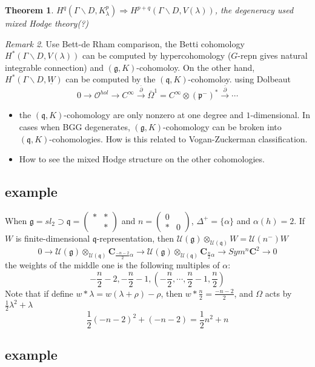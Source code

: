 \documentclass[leqno]{amsart}
\newcommand{\smat}[1]{\left( \begin{smallmatrix} #1 \end{smallmatrix} \right)}
\newcommand{\C}{\mathbf C}
\newcommand{\oo}{\mathcal O}
\newcommand{\1}{\mathbf{1}}
\newcommand{\cfg}{\mathfrak{g}}
\newcommand{\cfp}{\mathfrak{p}}
\newcommand{\cfq}{\mathfrak{q}}
\newtheorem{thm}{Theorem}[section]
\theoremstyle{definition}
\theoremstyle{remark}
\newtheorem{rem}[thm]{Remark}
\begin{document}
\begin{thm}
	$H^q(\Gamma\backslash D,K^p_\lambda)
	\Longrightarrow H^{p+q}
	(\Gamma\backslash D, V(\lambda))$,
	the degeneracy used mixed Hodge 
	theory(?)
\end{thm}
\begin{rem}
	Use Bett-de Rham comparison,
	the Betti cohomology
	$H^*(\Gamma\backslash D, V(\lambda))$
	can be computed by 
	hypercohomology
	($G$-repn gives natural 
	integrable connection)
	and
	$(\cfg,K)$-cohomoloy.
	On the other hand,
	$H^*(\Gamma\backslash D, \underline{W})$
	can be computed by the
	$(\cfq,K)$-cohomoloy.
	using Dolbeaut
	\[
		0\to \oo^{hol}\to C^\infty
		\xrightarrow{\bar{\partial}}
		\bar{\Omega}^1=
		C^\infty\otimes(\cfp^-)^*
		\xrightarrow{\bar{\partial}}\cdots
	\]
	\begin{itemize}
		\item the $(\cfq,K)$-cohomology
			are only nonzero at
			one degree and 
			 $1$-dimensional.
		In cases when BGG degenerates,
		$(\cfg,K)$-cohomology 
		can be broken into
		$(\cfq,K)$-cohomologies.
		How is this related to 
		Vogan-Zuckerman 
		classification.
	\item How to see the mixed Hodge structure
		on the other cohomologies.
	\end{itemize}
\end{rem}

\subsection{example}

When $\cfg=sl_2\supset \cfq=\smat{*&*\\&*}$ 
and $n=\smat{0&\\*&0}$,
$\Delta^+=\{\alpha\}$ and $\alpha(h)=2$.
If  $W$ is finite-dimensional  $\cfq$-representation,
then  $\mathcal{U}(\cfg)\otimes_{\mathcal{U}(\cfq)}W=\mathcal{U}(n^-)W$
\[
	0\to
	\mathcal{U}(\cfg)
	\otimes_{ \mathcal{U}(\cfq)}
	\C_{\frac{-n-2}{2}\alpha}\to
	\mathcal{U}(\cfg)
	\otimes_{ \mathcal{U}(\cfq)}
	\C_{\frac{n}{2}\alpha}\to
	Sym^n\C^2\to0
\]
the weights of the middle one is
the following multiples of $\alpha$:
 \[
	-\frac{n}{2}-2,
	-\frac{n}{2}-1,
	(-\frac{n}{2},\cdots,
	\frac{n}{2}-1,
	\frac{n}{2})
\]
Note that 
if define 
$w*\lambda=w(\lambda+\rho)-\rho$,
then  $w*\frac{n}{2}=\frac{-n-2}{2}$,
and $\Omega$ acts by
 $\frac{1}{2}\lambda^2+\lambda$
 \[
	 \frac{1}{2}(-n-2)^2+(-n-2)=
	 \frac{1}{2}n^2+n
 \]

\subsection{example}
\end{document}

